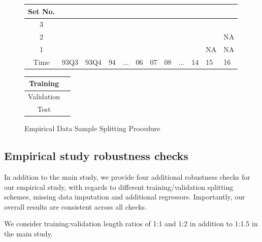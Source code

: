 \documentclass{article}
\begin{document}
\begin{figure}[!htb]
	\begin{center}
		\begin{tabular}{|c|p{0.55cm}p{0.55cm}p{0.50cm}p{0.50cm}p{0.50cm}p{0.50cm}p{0.50cm}p{0.50cm}p{0.50cm}p{0.50cm}p{0.50cm}|}
			\hline
			Set No. &&&&&&&&&&& \\
			\hline
			3 & \cellcolor{cyan} & \cellcolor{cyan} & \cellcolor{cyan} & \cellcolor{cyan} & \cellcolor{cyan} & \cellcolor{cyan} & 
			\cellcolor{pink} & \cellcolor{pink} & \cellcolor{pink} & \cellcolor{pink} &  \cellcolor{olive} \\
			2 & \cellcolor{cyan} & \cellcolor{cyan} & \cellcolor{cyan} & \cellcolor{cyan} & \cellcolor{cyan} & 
			\cellcolor{pink} & \cellcolor{pink} & \cellcolor{pink} & \cellcolor{pink} & 	
			\cellcolor{olive} & NA \\
			1 & \cellcolor{cyan} & \cellcolor{cyan} & \cellcolor{cyan} & \cellcolor{cyan} & 
			\cellcolor{pink} & \cellcolor{pink} & \cellcolor{pink} & \cellcolor{pink} &
			\cellcolor{olive} & NA & NA \\
			\hline
			Time & 93Q3 & 93Q4 & 94 & ... & 06 & 07 & 08 & ... & 14 & 15 & 16 \\
			\hline
		\end{tabular}
		\medskip
		\begin{tabular}{|c|p{0.55cm}|}
			\hline
			Training & \cellcolor{cyan} \\
			\hline
			Validation & \cellcolor{pink} \\
			\hline
			Test & \cellcolor{olive} \\
			\hline
		\end{tabular}
	\end{center}
	\caption{Empirical Data Sample Splitting Procedure}
	\label{emp_sample_split_diag}
\end{figure}

\newpage

\subsection{Empirical study robustness checks}

In addition to the main study, we provide four additional robustness checks for our empirical study, with regards to different training/validation splitting schemes, missing data imputation and additional regressors. Importantly, our overall results are consistent across all checks.

We consider training:validation length ratios of 1:1 and 1:2 in addition to 1:1.5 in the main study.
\end{document}
